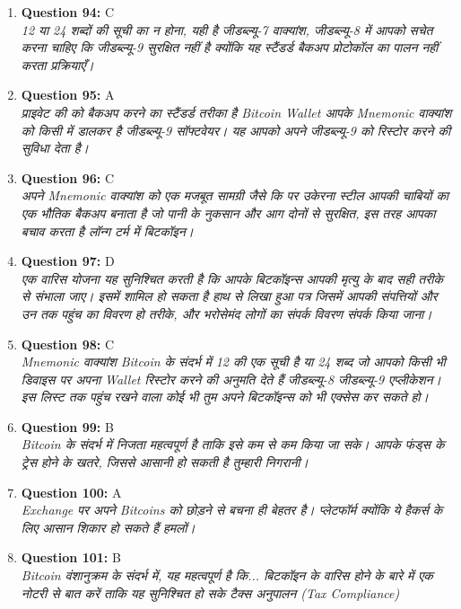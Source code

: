 \documentclass[12pt,a4paper]{article}
\begin{document}
\begin{enumerate}
\item \textbf{Question 94:} C
\\ \textit{12 या 24 शब्दों की सूची का न होना, यही है जीडब्ल्यू-7 वाक्यांश, जीडब्ल्यू-8 में आपको सचेत करना चाहिए कि जीडब्ल्यू-9 सुरक्षित नहीं है क्योंकि यह स्टैंडर्ड बैकअप प्रोटोकॉल का पालन नहीं करता प्रक्रियाएँ।}

\item \textbf{Question 95:} A
\\ \textit{प्राइवेट की को बैकअप करने का स्टैंडर्ड तरीका है Bitcoin Wallet आपके Mnemonic वाक्यांश को किसी में डालकर है जीडब्ल्यू-9 सॉफ्टवेयर। यह आपको अपने जीडब्ल्यू-9 को रिस्टोर करने की सुविधा देता है।}

\item \textbf{Question 96:} C
\\ \textit{अपने Mnemonic वाक्यांश को एक मजबूत सामग्री जैसे कि पर उकेरना स्टील आपकी चाबियों का एक भौतिक बैकअप बनाता है जो पानी के नुकसान और आग दोनों से सुरक्षित, इस तरह आपका बचाव करता है लॉन्ग टर्म में बिटकॉइन।}

\item \textbf{Question 97:} D
\\ \textit{एक वारिस योजना यह सुनिश्चित करती है कि आपके बिटकॉइन्स आपकी मृत्यु के बाद सही तरीके से संभाला जाए। इसमें शामिल हो सकता है हाथ से लिखा हुआ पत्र जिसमें आपकी संपत्तियों और उन तक पहुंच का विवरण हो तरीके, और भरोसेमंद लोगों का संपर्क विवरण संपर्क किया जाना।}

\item \textbf{Question 98:} C
\\ \textit{Mnemonic वाक्यांश Bitcoin के संदर्भ में 12 की एक सूची है या 24 शब्द जो आपको किसी भी डिवाइस पर अपना Wallet रिस्टोर करने की अनुमति देते हैं जीडब्ल्यू-8 जीडब्ल्यू-9 एप्लीकेशन। इस लिस्ट तक पहुंच रखने वाला कोई भी तुम अपने बिटकॉइन्स को भी एक्सेस कर सकते हो।}

\item \textbf{Question 99:} B
\\ \textit{Bitcoin के संदर्भ में निजता महत्वपूर्ण है ताकि इसे कम से कम किया जा सके। आपके फंड्स के ट्रेस होने के खतरे, जिससे आसानी हो सकती है तुम्हारी निगरानी।}

\item \textbf{Question 100:} A
\\ \textit{Exchange पर अपने Bitcoins को छोड़ने से बचना ही बेहतर है। प्लेटफॉर्म क्योंकि ये हैकर्स के लिए आसान शिकार हो सकते हैं हमलों।}

\item \textbf{Question 101:} B
\\ \textit{Bitcoin वंशानुक्रम के संदर्भ में, यह महत्वपूर्ण है कि... बिटकॉइन के वारिस होने के बारे में एक नोटरी से बात करें ताकि यह सुनिश्चित हो सके टैक्स अनुपालन (Tax Compliance)}


\end{enumerate}
\end{document}
